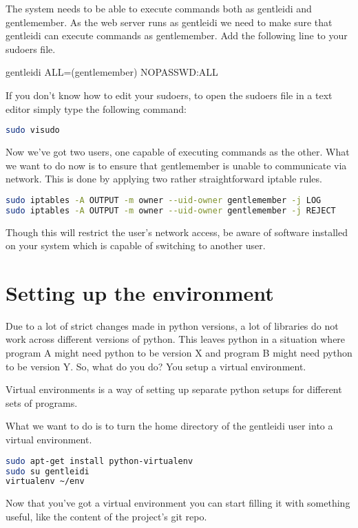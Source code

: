 The system needs to be able to execute commands both as gentleidi and
gentlemember. As the web server runs as gentleidi we need to make sure
that gentleidi can execute commands as gentlemember. Add the following
line to your sudoers file.\

gentleidi ALL=(gentlemember) NOPASSWD:ALL

If you don't know how to edit your sudoers, to open the
sudoers file in a text editor simply type the following command:

\begin{lstlisting}[language=bash]
sudo visudo
\end{lstlisting}

Now we've got two users, one capable of executing
commands as the other. What we want to do now is to ensure that
gentlemember is unable to communicate via network. This is done by
applying two rather straightforward iptable rules.

\begin{lstlisting}[language=bash]
sudo iptables -A OUTPUT -m owner --uid-owner gentlemember -j LOG
sudo iptables -A OUTPUT -m owner --uid-owner gentlemember -j REJECT
\end{lstlisting}

Though this will restrict the user's network access, be
aware of software installed on your system which is capable of
switching to another user.

\section{Setting up the environment}

Due to a lot of strict changes made in python versions, a lot of
libraries do not work across different versions of python. This leaves
python in a situation where program A might need python to be version X
and program B might need python to be version Y. So, what do you do?
You setup a virtual environment.

Virtual environments is a way of setting up separate python setups for
different sets of programs.

What we want to do is to turn the home directory of the gentleidi user
into a virtual environment.

\begin{lstlisting}[language=bash]
sudo apt-get install python-virtualenv
sudo su gentleidi
virtualenv ~/env
\end{lstlisting}

Now that you've got a virtual environment you can start
filling it with something useful, like the content of the
project's git repo.

